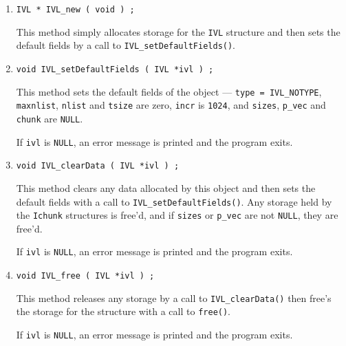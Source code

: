 \begin{enumerate}
\item
\begin{verbatim}
IVL * IVL_new ( void ) ;
\end{verbatim}
This method simply allocates storage for the {\tt IVL} structure 
and then sets the default fields by a call to 
{\tt IVL\_setDefaultFields()}.
\item
\begin{verbatim}
void IVL_setDefaultFields ( IVL *ivl ) ;
\end{verbatim}
This method sets the default fields of the object ---
{\tt type = IVL\_NOTYPE},
{\tt maxnlist}, {\tt nlist} and {\tt tsize} are zero,
{\tt incr} is {\tt 1024},
and {\tt sizes}, {\tt p\_vec} and {\tt chunk} are {\tt NULL}.
\par {}
If {\tt ivl} is {\tt NULL},
an error message is printed and the program exits.
\item
\begin{verbatim}
void IVL_clearData ( IVL *ivl ) ;
\end{verbatim}
This method clears any data allocated by this object and then sets
the default fields 
with a call to {\tt IVL\_setDefaultFields()}.
Any storage held by the {\tt Ichunk} structures is free'd,
and if {\tt sizes} or {\tt p\_vec} are not {\tt NULL},
they are free'd.
\par {}
If {\tt ivl} is {\tt NULL},
an error message is printed and the program exits.
\item
\begin{verbatim}
void IVL_free ( IVL *ivl ) ;
\end{verbatim}
This method releases any storage by a call to 
{\tt IVL\_clearData()} then free's the storage for the 
structure with a call to {\tt free()}.
\par {}
If {\tt ivl} is {\tt NULL},
an error message is printed and the program exits.
\end{enumerate}
\par
\par
